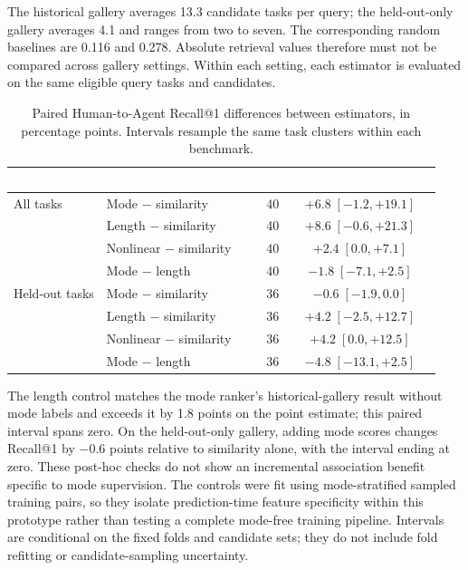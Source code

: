 The historical gallery averages 13.3 candidate tasks per query; the held-out-only gallery averages 4.1 and ranges from two to seven. The corresponding random baselines are 0.116 and 0.278. Absolute retrieval values therefore must not be compared across gallery settings. Within each setting, each estimator is evaluated on the same eligible query tasks and candidates.

\begin{table}[tb]
\centering
\caption{Paired Human-to-Agent Recall@1 differences between estimators, in percentage points. Intervals resample the same task clusters within each benchmark.}
\label{tab:specificity-deltas}
\small
{}
\begin{tabular}{llrc}
\toprule
\rowcolor{TableInk}
\textcolor{white}{Gallery} & \textcolor{white}{Contrast} & \textcolor{white}{Tasks} & \textcolor{white}{$\Delta$ Recall@1 (95\% CI)} \\
\midrule
All tasks & Mode $-$ similarity & 40 & $+6.8\;[-1.2, +19.1]$ \\
\rowcolor{TableControl}
 & Length $-$ similarity & 40 & $+8.6\;[-0.6, +21.3]$ \\
 & Nonlinear $-$ similarity & 40 & $+2.4\;[0.0, +7.1]$ \\
\rowcolor{TableMode}
 & Mode $-$ length & 40 & $-1.8\;[-7.1, +2.5]$ \\
\midrule
\rowcolor{TableMode}
Held-out tasks & Mode $-$ similarity & 36 & $-0.6\;[-1.9, 0.0]$ \\
\rowcolor{TableControl}
 & Length $-$ similarity & 36 & $+4.2\;[-2.5, +12.7]$ \\
 & Nonlinear $-$ similarity & 36 & $+4.2\;[0.0, +12.5]$ \\
\rowcolor{TableMode}
 & Mode $-$ length & 36 & $-4.8\;[-13.1, +2.5]$ \\
\bottomrule
\end{tabular}
\end{table}

The length control matches the mode ranker's historical-gallery result without mode labels and exceeds it by 1.8 points on the point estimate; this paired interval spans zero. On the held-out-only gallery, adding mode scores changes Recall@1 by $-0.6$ points relative to similarity alone, with the interval ending at zero. These post-hoc checks do not show an incremental association benefit specific to mode supervision. The controls were fit using mode-stratified sampled training pairs, so they isolate prediction-time feature specificity within this prototype rather than testing a complete mode-free training pipeline. Intervals are conditional on the fixed folds and candidate sets; they do not include fold refitting or candidate-sampling uncertainty.

